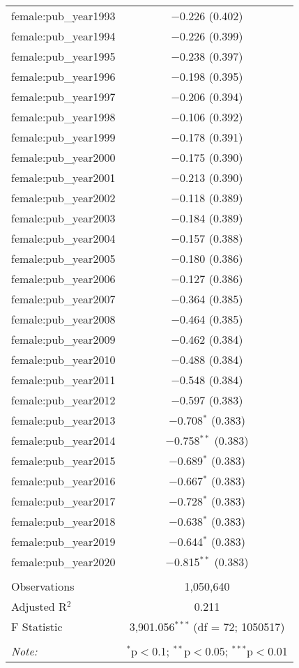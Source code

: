 \begin{table}[!htbp]
\begin{tabular}{@{\extracolsep{5pt}}lc}
  female:pub\_year1993 & $-$0.226 (0.402) \\ 
  female:pub\_year1994 & $-$0.226 (0.399) \\ 
  female:pub\_year1995 & $-$0.238 (0.397) \\ 
  female:pub\_year1996 & $-$0.198 (0.395) \\ 
  female:pub\_year1997 & $-$0.206 (0.394) \\ 
  female:pub\_year1998 & $-$0.106 (0.392) \\ 
  female:pub\_year1999 & $-$0.178 (0.391) \\ 
  female:pub\_year2000 & $-$0.175 (0.390) \\ 
  female:pub\_year2001 & $-$0.213 (0.390) \\ 
  female:pub\_year2002 & $-$0.118 (0.389) \\ 
  female:pub\_year2003 & $-$0.184 (0.389) \\ 
  female:pub\_year2004 & $-$0.157 (0.388) \\ 
  female:pub\_year2005 & $-$0.180 (0.386) \\ 
  female:pub\_year2006 & $-$0.127 (0.386) \\ 
  female:pub\_year2007 & $-$0.364 (0.385) \\ 
  female:pub\_year2008 & $-$0.464 (0.385) \\ 
  female:pub\_year2009 & $-$0.462 (0.384) \\ 
  female:pub\_year2010 & $-$0.488 (0.384) \\ 
  female:pub\_year2011 & $-$0.548 (0.384) \\ 
  female:pub\_year2012 & $-$0.597 (0.383) \\ 
  female:pub\_year2013 & $-$0.708$^{*}$ (0.383) \\ 
  female:pub\_year2014 & $-$0.758$^{**}$ (0.383) \\ 
  female:pub\_year2015 & $-$0.689$^{*}$ (0.383) \\ 
  female:pub\_year2016 & $-$0.667$^{*}$ (0.383) \\ 
  female:pub\_year2017 & $-$0.728$^{*}$ (0.383) \\ 
  female:pub\_year2018 & $-$0.638$^{*}$ (0.383) \\ 
  female:pub\_year2019 & $-$0.644$^{*}$ (0.383) \\ 
  female:pub\_year2020 & $-$0.815$^{**}$ (0.383) \\ 
 \hline \\[-1.8ex] 
Observations & 1,050,640 \\ 
Adjusted R$^{2}$ & 0.211 \\ 
F Statistic & 3,901.056$^{***}$ (df = 72; 1050517) \\ 
\hline 
\hline \\[-1.8ex] 
\textit{Note:}  & \multicolumn{1}{l}{$^{*}$p$<$0.1; $^{**}$p$<$0.05; $^{***}$p$<$0.01} \\ 
\end{tabular} 
\end{table} 
